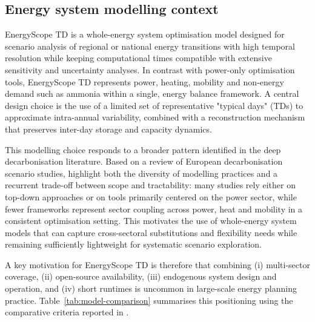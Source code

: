 \documentclass{article}
\begin{document}
\subsection{Energy system modelling context}
EnergyScope TD is a whole-energy system optimisation model designed for scenario analysis of regional or national energy transitions with high temporal resolution while keeping computational times compatible with extensive sensitivity and uncertainty analyses. In contrast with power-only optimisation tools, EnergyScope TD represents power, heating, mobility and non-energy demand such as ammonia within a single, energy balance framework. A central design choice is the use of a limited set of representative "typical days" (TDs) to approximate intra-annual variability, combined with a reconstruction mechanism that preserves inter-day storage and capacity dynamics.

This modelling choice responds to a broader pattern identified in the deep decarbonisation literature. Based on a review of European decarbonisation scenario studies, \citet{borasioDeepDecarbonisationRegional2022} highlight both the diversity of modelling practices and a recurrent trade-off between scope and tractability: many studies rely either on top-down approaches or on tools primarily centered on the power sector, while fewer frameworks represent sector coupling across power, heat and mobility in a consistent optimisation setting. This motivates the use of whole-energy system models that can capture cross-sectoral substitutions and flexibility needs while remaining sufficiently lightweight for systematic scenario exploration.

A key motivation for EnergyScope TD is therefore that combining (i) multi-sector coverage, (ii) open-source availability, (iii) endogenous system design and operation, and (iv) short runtimes is uncommon in large-scale energy planning practice. Table~\ref{tab:model-comparison} summarises this positioning using the comparative criteria reported in \citet{limpensEnergyScopeTDNovel2019}.
\end{document}
